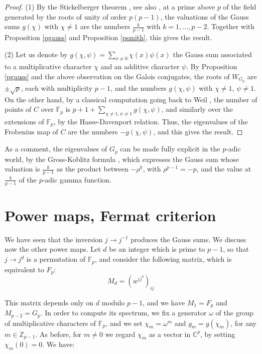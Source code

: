 \documentclass[11pt]{amsart}
\theoremstyle{definition}
\begin{document}
\begin{proof}
(1) By the Stickelberger theorem \cite{sti}, see also \cite{iro}, at a prime above $p$ of the field generated by the roots of unity of order $p(p-1)$, the valuations of the Gauss sums $g(\chi)$ with $\chi\neq1$ are the numbers $\frac{k}{p-1}$ with $k=1,\ldots,p-2$. Together with Proposition \ref{pgauss} and Proposition \ref{psmith}, this gives the result.

\medskip

(2) Let us denote by $g(\chi,\psi)=\sum_{x\neq0}\chi(x)\psi(x)$ the Gauss sum associated to a multiplicative character $\chi$ and an additive character $\psi$. By Proposition \ref{pgauss} and the above observation on the Galois conjugates, the roots of $W_{G_p}$ are $\pm\sqrt{p}$, each with multiplicity $p-1$, and the numbers $g(\chi,\psi)$ with $\chi\neq1$, $\psi\neq1$. On the other hand, by a classical computation going back to Weil \cite{we2}, the number of points of $C$ over $\mathbb F_p$ is $p+1+\sum_{\chi\neq1,\psi\neq1}g(\chi,\psi)$, and similarly over the extensions of $\mathbb F_p$, by the Hasse-Davenport relation. Thus, the eigenvalues of the Frobenius map of $C$ are the numbers $-g(\chi,\psi)$, and this gives the result.
\end{proof}

As a comment, the eigenvalues of $G_p$ can be made fully explicit in the $p$-adic world, by the Gross-Koblitz formula \cite{gko}, which expresses the Gauss sum whose valuation is $\frac{k}{p-1}$ as the product between $-\rho^k$, with $\rho^{p-1}=-p$, and the value at $\frac{k}{p-1}$ of the $p$-adic gamma function.

\section{Power maps, Fermat criterion}

We have seen that the inversion $j\to j^{-1}$ produces the Gauss sums. We discuss now the other power maps. Let $d$ be an integer which is prime to $p-1$, so that $j\to j^d$ is a permutation of $\mathbb F_p$, and consider the following matrix, which is equivalent to $F_p$:
$$M_d=(w^{ij^d})_{ij}$$

This matrix depends only on $d$ modulo $p-1$, and we have $M_1=F_p$ and $M_{p-2}=G_p$. In order to compute its spectrum, we fix a generator $\omega$ of the group of multiplicative characters of $\mathbb F_p$, and we set $\chi_m=\omega^m$ and $g_m=g(\chi_m)$, for any $m\in\mathbb Z_{p-1}$. As before, for $m\neq0$ we regard $\chi_m$ as a vector in $\mathbb C^p$, by setting $\chi_m(0)=0$. We have:
\end{document}
